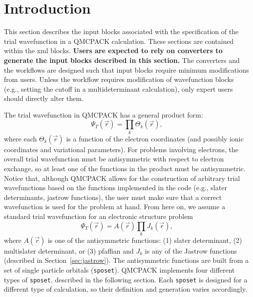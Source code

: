\section{Introduction}
\label{sec:intro_wavefunction}

This section describes the input blocks associated with the specification of the trial wavefunction in a QMCPACK calculation. These sections are contained within the  xml blocks. \textbf{Users are expected to rely on converters to generate the input blocks described in this section.} The converters and the workflows are designed such that input blocks require minimum modifications from users. Unless the workflow requires modification of wavefunction blocks (e.g., setting the cutoff in a multideterminant calculation), only expert users should directly alter them.
  
The trial wavefunction in QMCPACK has a general product form:
\begin{equation}
\Psi_T(\vec{r}) = \prod_k \Theta_k(\vec{r}) ,
\end{equation}
where each $\Theta_k(\vec{r})$ is a function of the electron coordinates (and possibly ionic coordinates and variational parameters). For problems involving electrons, the overall trial wavefunction must be antisymmetric with respect to electron exchange, so at least one of the functions in the product must be antisymmetric. Notice that, although QMCPACK allows for the construction of arbitrary trial wavefunctions based on the functions implemented in the code (e.g., slater determinants, jastrow functions), the user must make sure that a correct wavefunction is used for the problem at hand. From here on, we assume a standard trial wavefunction for an electronic structure problem 
\begin{equation}
\Psi_T(\vec{r}) =  \textit{A}(\vec{r}) \prod_k \textit{J}_k(\vec{r}),
\end{equation}
where $\textit{A}(\vec{r})$ is one of the antisymmetric functions: (1) slater determinant, (2) multislater determinant, or (3) pfaffian and $\textit{J}_k$ is any of the Jastrow functions (described in Section~\ref{sec:jastrow}).  The antisymmetric functions are built from a set of single particle orbitals (\texttt{sposet}). QMCPACK implements four different types of \texttt{sposet}, described in the following section. Each \texttt{sposet} is designed for a different type of calculation, so their definition and generation varies accordingly. 
